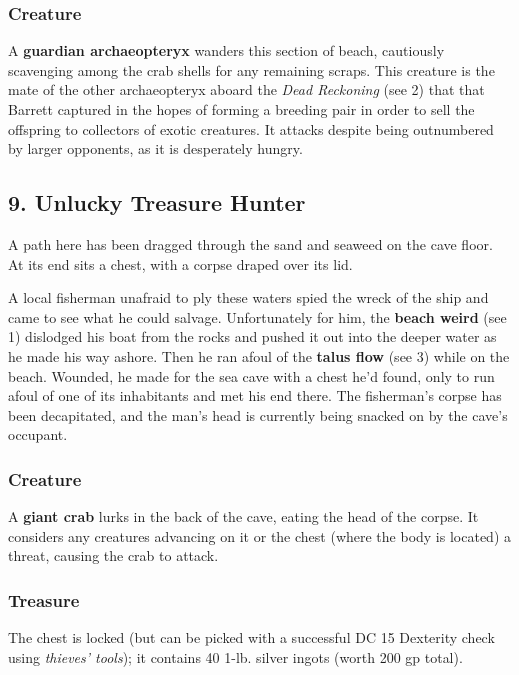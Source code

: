 \documentclass[10pt,a4paper,twoside,bg=print,twocolumn,openany,nodeprecatedcode]{dndbook}
\begin{document}
\subsubsection{Creature}
A \textbf{guardian archaeopteryx} wanders this section of beach, cautiously scavenging among the crab shells for any remaining scraps. This creature is the mate of the other archaeopteryx aboard the \textit{Dead Reckoning} (see 2) that that Barrett captured in the hopes of forming a breeding pair in order to sell the offspring to collectors of exotic creatures. It attacks despite being outnumbered by larger opponents, as it is desperately hungry.

\subsection{9. Unlucky Treasure Hunter}
\begin{DndReadAloud}{}
A path here has been dragged through the sand and seaweed on the cave floor. At its end sits a chest, with a corpse draped over its lid.

\end{DndReadAloud}

A local fisherman unafraid to ply these waters spied the wreck of the ship and came to see what he could salvage. Unfortunately for him, the \textbf{beach weird} (see 1) dislodged his boat from the rocks and pushed it out into the deeper water as he made his way ashore. Then he ran afoul of the \textbf{talus flow} (see 3) while on the beach. Wounded, he made for the sea cave with a chest he'd found, only to run afoul of one of its inhabitants and met his end there. The fisherman's corpse has been decapitated, and the man's head is currently being snacked on by the cave's occupant.

\subsubsection{Creature}
A \textbf{giant crab} lurks in the back of the cave, eating the head of the corpse. It considers any creatures advancing on it or the chest (where the body is located) a threat, causing the crab to attack.

\subsubsection{Treasure}
The chest is locked (but can be picked with a successful DC 15 Dexterity check using \textit{thieves' tools}); it contains 40 1-lb. silver ingots (worth 200 gp total).
\end{document}
